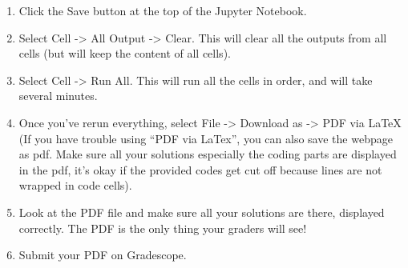\documentclass[11pt]{article}
\providecommand{\tightlist}{%
      \setlength{\itemsep}{0pt}\setlength{\parskip}{0pt}}
\begin{document}
\begin{enumerate}
\def\labelenumi{\arabic{enumi}.}
\tightlist
\item
  Click the Save button at the top of the Jupyter Notebook.
\item
  Select Cell -\textgreater{} All Output -\textgreater{} Clear. This
  will clear all the outputs from all cells (but will keep the content
  of all cells).
\item
  Select Cell -\textgreater{} Run All. This will run all the cells in
  order, and will take several minutes.
\item
  Once you've rerun everything, select File -\textgreater{} Download as
  -\textgreater{} PDF via LaTeX (If you have trouble using ``PDF via
  LaTex'', you can also save the webpage as pdf. Make sure all your
  solutions especially the coding parts are displayed in the pdf, it's
  okay if the provided codes get cut off because lines are not wrapped
  in code cells).
\item
  Look at the PDF file and make sure all your solutions are there,
  displayed correctly. The PDF is the only thing your graders will see!
\item
  Submit your PDF on Gradescope.
\end{enumerate}


    
    
    
\end{document}
